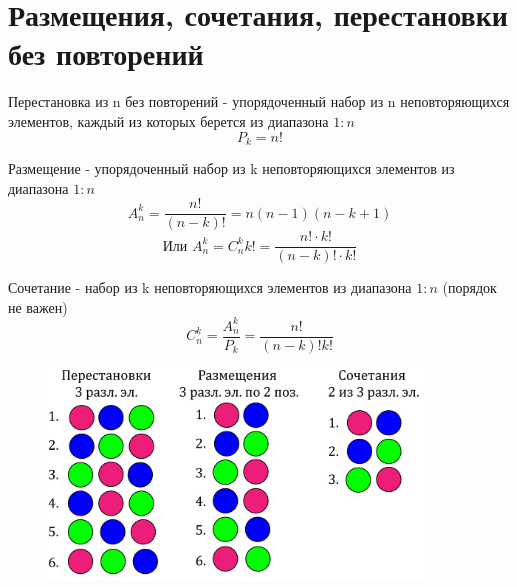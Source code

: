 \documentclass[discrete.tex]{subfiles}
\begin{document}
\section{Размещения, сочетания, перестановки без повторений}
\begin{definition}
  Перестановка из n без повторений - упорядоченный набор из n неповторяющихся элементов, каждый из которых берется из диапазона $1:n$
  \[P_k = n!\]
\end{definition}

\begin{definition}
  Размещение - упорядоченный набор из k неповторяющихся элементов из диапазона $1:n$
  \[A_n^k = \dfrac{n!}{(n-k)!} = n (n-1)(n-k+1)\]
  \[\text{Или } A^k_n = C^k_n k! = \frac{n! \cdot k!}{(n - k)! \cdot k!}\]
\end{definition}

\begin{definition}
  Сочетание - набор из k неповторяющихся элементов из диапазона $1:n$ (порядок не важен)
  \[C_n^k = \frac{A_n^k}{P_k} = \dfrac{n!}{(n-k)! k!}\]
\end{definition}

\begin{figure}[H]
    \includegraphics[width=10cm]{pics/5_1.png}
    \centering
\end{figure}
\end{document}
